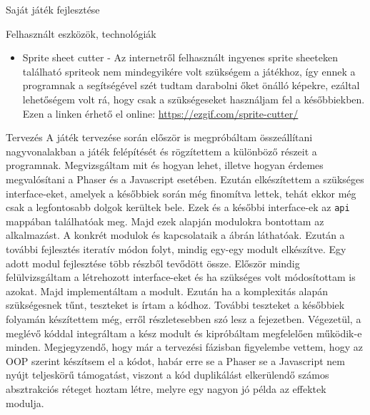 \begin{MyChapter}{Saját játék fejlesztése}
\begin{MySection}{Felhasznált eszközök, technológiák}
\begin{itemize}
			\item Sprite sheet cutter - Az internetről felhasznált ingyenes sprite sheeteken található spriteok nem mindegyikére volt szükségem a játékhoz, így ennek a programnak a segítségével szét tudtam darabolni őket önálló képekre, ezáltal lehetőségem volt rá, hogy csak a szükségeseket használjam fel a későbbiekben. Ezen a linken érhető el online: \url{https://ezgif.com/sprite-cutter/}
			
		\end{itemize}
		
	\end{MySection}
	
	\begin{MySection}{Tervezés}
		A játék tervezése során először is megpróbáltam összeállítani nagyvonalakban a játék felépítését és rögzítettem a különböző részeit a programnak. Megvizsgáltam mit és hogyan lehet, illetve hogyan érdemes megvalósítani a Phaser és a Javascript esetében.
		Ezután elkészítettem a szükséges interface-eket, amelyek a későbbiek során még finomítva lettek, tehát ekkor még csak a legfontosabb dolgok kerültek bele. Ezek és a későbbi interface-ek az \texttt{api} mappában találhatóak meg. Majd ezek alapján modulokra bontottam az alkalmazást. A konkrét modulok és kapcsolataik a  ábrán láthatóak. Ezután a további fejlesztés iteratív módon folyt, mindig egy-egy modult elkészítve. Egy adott modul fejlesztése több részből tevődött össze. Először mindig felülvizsgáltam a létrehozott interface-eket és ha szükséges volt módosítottam is azokat. Majd implementáltam a modult. Ezután ha a komplexitás alapán szükségesnek tűnt, teszteket is írtam a kódhoz. További teszteket a későbbiek folyamán készítettem még, erről részletesebben szó lesz a  fejezetben. Végezetül, a meglévő kóddal integráltam a kész modult és kipróbáltam megfelelően működik-e minden. Megjegyzendő, hogy már a tervezési fázisban figyelembe vettem, hogy az OOP szerint készítsem el a kódot, habár erre se a Phaser se a Javascript nem nyújt teljeskörű támogatást, viszont a kód duplikálást elkerülendő számos absztrakciós réteget hoztam létre, melyre egy nagyon jó példa az effektek modulja.
		

\end{MySection}
\end{MyChapter}
